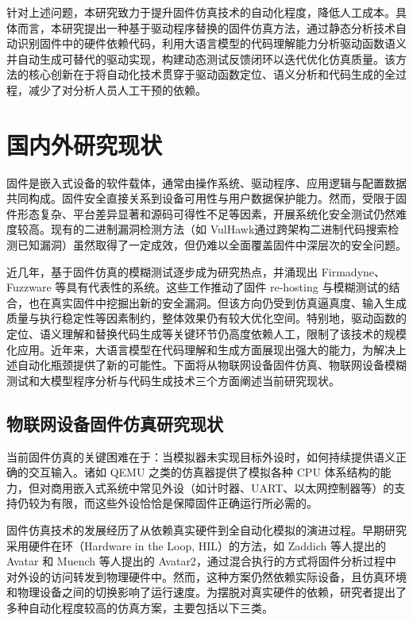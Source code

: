 针对上述问题，本研究致力于提升固件仿真技术的自动化程度，降低人工成本。具体而言，本研究提出一种基于驱动程序替换的固件仿真方法，通过静态分析技术自动识别固件中的硬件依赖代码，利用大语言模型的代码理解能力分析驱动函数语义并自动生成可替代的驱动实现，构建动态测试反馈闭环以迭代优化仿真质量。该方法的核心创新在于将自动化技术贯穿于驱动函数定位、语义分析和代码生成的全过程，减少了对分析人员人工干预的依赖。

\section{国内外研究现状}
\label{sec:related}

固件是嵌入式设备的软件载体，通常由操作系统、驱动程序、应用逻辑与配置数据共同构成。固件安全直接关系到设备可用性与用户数据保护能力。然而，受限于固件形态复杂、平台差异显著和源码可得性不足等因素，开展系统化安全测试仍然难度较高\cite{li2022iotfirmwaresurvey}。现有的二进制漏洞检测方法（如 VulHawk\cite{luo_vulhawk_2023}通过跨架构二进制代码搜索检测已知漏洞）虽然取得了一定成效，但仍难以全面覆盖固件中深层次的安全问题。

近几年，基于固件仿真的模糊测试逐步成为研究热点，并涌现出 Firmadyne\cite{firmadyne}、Fuzzware\cite{fuzzware} 等具有代表性的系统。这些工作推动了固件 re-hosting 与模糊测试的结合，也在真实固件中挖掘出新的安全漏洞。但该方向仍受到仿真逼真度、输入生成质量与执行稳定性等因素制约，整体效果仍有较大优化空间。特别地，驱动函数的定位、语义理解和替换代码生成等关键环节仍高度依赖人工，限制了该技术的规模化应用。近年来，大语言模型在代码理解和生成方面展现出强大的能力，为解决上述自动化瓶颈提供了新的可能性。下面将从物联网设备固件仿真、物联网设备模糊测试和大模型程序分析与代码生成技术三个方面阐述当前研究现状。

\subsection{物联网设备固件仿真研究现状}
\label{sec:firmware_sim}

当前固件仿真的关键困难在于：当模拟器未实现目标外设时，如何持续提供语义正确的交互输入。诸如 QEMU\cite{qemu} 之类的仿真器提供了模拟各种 CPU 体系结构的能力，但对商用嵌入式系统中常见外设（如计时器、UART、以太网控制器等）的支持仍较为有限，而这些外设恰恰是保障固件正确运行所必需的。

固件仿真技术的发展经历了从依赖真实硬件到全自动化模拟的演进过程。早期研究采用硬件在环（Hardware in the Loop, HIL）的方法，如 Zaddich 等人提出的 Avatar\cite{avatar} 和 Muench 等人提出的 Avatar2\cite{avatar2}，通过混合执行的方式将固件分析过程中对外设的访问转发到物理硬件中。然而，这种方案仍然依赖实际设备，且仿真环境和物理设备之间的切换影响了运行速度。为摆脱对真实硬件的依赖，研究者提出了多种自动化程度较高的仿真方案，主要包括以下三类。

